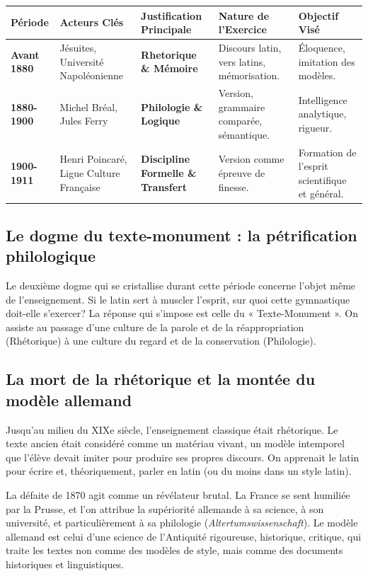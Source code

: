 \begin{table}[h!]\small\centering\begin{tabular}{| l | l | l | l | l |}\hline\textbf{Période} & \textbf{Acteurs Clés} & \textbf{Justification Principale} & \textbf{Nature de l'Exercice} & \textbf{Objectif Visé} \\ \hline\textbf{Avant 1880} & Jésuites, Université Napoléonienne & \textbf{Rhetorique \& Mémoire} & Discours latin, vers latins, mémorisation. & Éloquence, imitation des modèles. \\ \hline\textbf{1880-1900} & Michel Bréal, Jules Ferry & \textbf{Philologie \& Logique} & Version, grammaire comparée, sémantique. & Intelligence analytique, rigueur. \\ \hline\textbf{1900-1911} & Henri Poincaré, Ligue Culture Française & \textbf{Discipline Formelle \& Transfert} & Version comme épreuve de finesse. & Formation de l'esprit scientifique et général. \\ \hline\end{tabular}\end{table}

\subsection{Le dogme du texte-monument : la pétrification philologique}

Le deuxième dogme qui se cristallise durant cette période concerne l'objet même de l'enseignement.
Si le latin sert à muscler l'esprit, sur quoi cette gymnastique doit-elle s'exercer? La réponse qui
s'impose est celle du « Texte-Monument ». On assiste au passage d'une culture de la parole et de la
réappropriation (Rhétorique) à une culture du regard et de la conservation (Philologie).



\subsection{La mort de la rhétorique et la montée du modèle allemand}

Jusqu'au milieu du XIXe siècle, l'enseignement classique était rhétorique. Le texte ancien était
considéré comme un matériau vivant, un modèle intemporel que l'élève devait imiter pour produire ses
propres discours. On apprenait le latin pour écrire et, théoriquement, parler en latin (ou du moins
dans un style latin).

La défaite de 1870 agit comme un révélateur brutal. La France se sent humiliée par la Prusse, et
l'on attribue la supériorité allemande à sa science, à son université, et particulièrement à sa
philologie (\textit{Altertumswissenschaft}). Le modèle allemand est celui d'une science de
l'Antiquité rigoureuse, historique, critique, qui traite les textes non comme des modèles de style,
mais comme des documents historiques et linguistiques.\cite{I-1-3-ref8}



